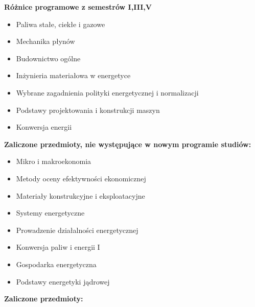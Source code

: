\documentclass[a4paper,12pt]{article}
\begin{document}
\textbf{Różnice programowe z semestrów I,III,V}
\begin{itemize}
\item Paliwa stałe, ciekłe i gazowe
\item Mechanika płynów
\item Budownictwo ogólne
\item Inżynieria materiałowa w energetyce
\item Wybrane zagadnienia polityki energetycznej i normalizacji
\item Podstawy projektowania i konstrukcji maszyn
\item Konwersja energii
\end{itemize}
\vspace{20pt}
\textbf{Zaliczone przedmioty, nie występujące w nowym programie studiów:}
\begin{itemize}
\item Mikro i makroekonomia
\item Metody oceny efektywności ekonomicznej
\item Materiały konstrukcyjne i eksploatacyjne
\item Systemy energetyczne
\item Prowadzenie działalności energetycznej
\item Konwersja paliw i energii I
\item Gospodarka energetyczna
\item Podstawy energetyki jądrowej
\end{itemize}
\newpage
\textbf{Zaliczone przedmioty:}
\end{document}
